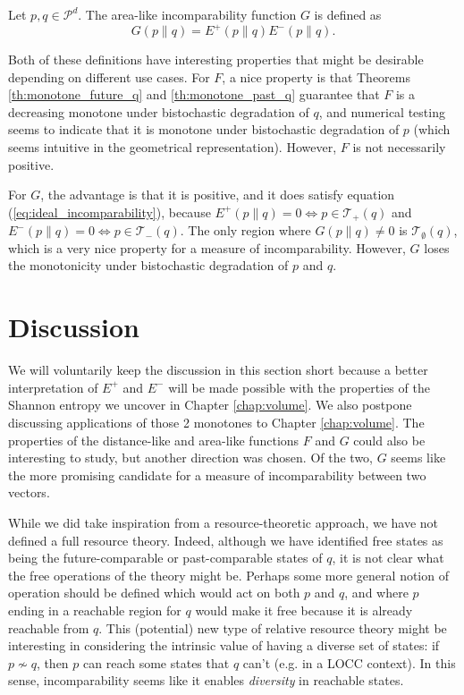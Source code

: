 \begin{definition} \label{def:area-like_function}
    Let $p, q \in \mathcal{P}^d$. The area-like incomparability function $G$ is defined as 
    \begin{equation}
        G(p \parallel q) = E^+(p \parallel q) E^-(p \parallel q).
    \end{equation}
\end{definition}

Both of these definitions have interesting properties that might be desirable depending on different use cases. For $F$, a nice property is that Theorems \ref{th:monotone_future_q} and \ref{th:monotone_past_q} guarantee that $F$ is a decreasing monotone under bistochastic degradation of $q$, and numerical testing seems to indicate that it is monotone under bistochastic degradation of $p$ (which seems intuitive in the geometrical representation). However, $F$ is not necessarily positive.

For $G$, the advantage is that it is positive, and it does satisfy equation (\ref{eq:ideal_incomparability}), because $E^+(p \parallel q) = 0 \iff p \in \mathcal{T}_+(q)$ and $E^-(p \parallel q) = 0 \iff p \in \mathcal{T}_-(q)$. The only region where $G(p \parallel q) \neq 0$ is $\mathcal{T}_\emptyset(q)$, which is a very nice property for a measure of incomparability. However, $G$ loses the monotonicity under bistochastic degradation of $p$ and $q$.



\section{Discussion}

We will voluntarily keep the discussion in this section short because a better interpretation of $E^+$ and $E^-$ will be made possible with the properties of the Shannon entropy we uncover in Chapter \ref{chap:volume}. We also postpone discussing applications of those 2 monotones to Chapter \ref{chap:volume}. The properties of the distance-like and area-like functions $F$ and $G$ could also be interesting to study, but another direction was chosen. Of the two, $G$ seems like the more promising candidate for a measure of incomparability between two vectors.

While we did take inspiration from a resource-theoretic approach, we have not defined a full resource theory. Indeed, although we have identified free states as being the future-comparable or past-comparable states of $q$, it is not clear what the free operations of the theory might be. Perhaps some more general notion of operation should be defined which would act on both $p$ and $q$, and where $p$ ending in a reachable region for $q$ would make it free because it is already reachable from $q$. This (potential) new type of relative resource theory might be interesting in considering the intrinsic value of having a diverse set of states: if $p \nsim q$, then $p$ can reach some states that $q$ can't (e.g. in a LOCC context). In this sense, incomparability seems like it enables \textit{diversity} in reachable states.

